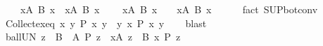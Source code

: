 \begin{isabellebody}
\ \ {\isachardoublequoteopen}{\isacharbraceleft}{\kern0pt}{\isacharbraceright}{\kern0pt}\ {\isacharequal}{\kern0pt}\ {\isacharparenleft}{\kern0pt}{\isasymUnion}x{\isasymin}A{\isachardot}{\kern0pt}\ B\ x{\isacharparenright}{\kern0pt}\ {\isasymlongleftrightarrow}\ {\isacharparenleft}{\kern0pt}{\isasymforall}x{\isasymin}A{\isachardot}{\kern0pt}\ B\ x\ {\isacharequal}{\kern0pt}\ {\isacharbraceleft}{\kern0pt}{\isacharbraceright}{\kern0pt}{\isacharparenright}{\kern0pt}{\isachardoublequoteclose}\isanewline
\ \ {\isachardoublequoteopen}{\isacharparenleft}{\kern0pt}{\isasymUnion}x{\isasymin}A{\isachardot}{\kern0pt}\ B\ x{\isacharparenright}{\kern0pt}\ {\isacharequal}{\kern0pt}\ {\isacharbraceleft}{\kern0pt}{\isacharbraceright}{\kern0pt}\ {\isasymlongleftrightarrow}\ {\isacharparenleft}{\kern0pt}{\isasymforall}x{\isasymin}A{\isachardot}{\kern0pt}\ B\ x\ {\isacharequal}{\kern0pt}\ {\isacharbraceleft}{\kern0pt}{\isacharbraceright}{\kern0pt}{\isacharparenright}{\kern0pt}{\isachardoublequoteclose}\isanewline
%
\isadelimproof
\ \ %
\endisadelimproof
%
\isatagproof
{}\isamarkupfalse%
\ {\isacharparenleft}{\kern0pt}fact\ SUP{\isacharunderscore}{\kern0pt}bot{\isacharunderscore}{\kern0pt}conv{\isacharparenright}{\kern0pt}{\isacharplus}{\kern0pt}%
\endisatagproof
{\isafoldproof}%
%
\isadelimproof
%
\endisadelimproof
\ \isanewline
\isanewline
{}\isamarkupfalse%
\ Collect{\isacharunderscore}{\kern0pt}ex{\isacharunderscore}{\kern0pt}eq{\isacharcolon}{\kern0pt}\ {\isachardoublequoteopen}{\isacharbraceleft}{\kern0pt}x{\isachardot}{\kern0pt}\ {\isasymexists}y{\isachardot}{\kern0pt}\ P\ x\ y{\isacharbraceright}{\kern0pt}\ {\isacharequal}{\kern0pt}\ {\isacharparenleft}{\kern0pt}{\isasymUnion}y{\isachardot}{\kern0pt}\ {\isacharbraceleft}{\kern0pt}x{\isachardot}{\kern0pt}\ P\ x\ y{\isacharbraceright}{\kern0pt}{\isacharparenright}{\kern0pt}{\isachardoublequoteclose}\isanewline
%
\isadelimproof
\ \ %
\endisadelimproof
%
\isatagproof
{}\isamarkupfalse%
\ blast%
\endisatagproof
{\isafoldproof}%
%
\isadelimproof
\isanewline
%
\endisadelimproof
\isanewline
{}\isamarkupfalse%
\ ball{\isacharunderscore}{\kern0pt}UN{\isacharcolon}{\kern0pt}\ {\isachardoublequoteopen}{\isacharparenleft}{\kern0pt}{\isasymforall}z\ {\isasymin}\ {\isasymUnion}{\isacharparenleft}{\kern0pt}B\ {\isacharbackquote}{\kern0pt}\ A{\isacharparenright}{\kern0pt}{\isachardot}{\kern0pt}\ P\ z{\isacharparenright}{\kern0pt}\ {\isasymlongleftrightarrow}\ {\isacharparenleft}{\kern0pt}{\isasymforall}x{\isasymin}A{\isachardot}{\kern0pt}\ {\isasymforall}z\ {\isasymin}\ B\ x{\isachardot}{\kern0pt}\ P\ z{\isacharparenright}{\kern0pt}{\isachardoublequoteclose}\isanewline

\end{isabellebody}
